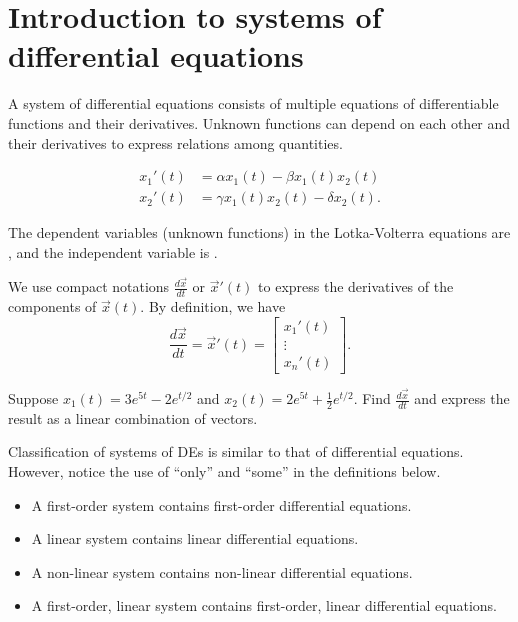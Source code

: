\documentclass[../main.tex]{subfiles}
\begin{document}
 \section{Introduction to systems of differential equations}

A system of differential equations consists of multiple equations of differentiable functions and their derivatives.  Unknown functions can depend on each other and their derivatives to express relations among quantities.

\begin{example} \label{ex:lotka-volterra-intro}
  \begin{align*}
    x_{1}'(t) &= \alpha x_{1}(t) - \beta x_{1}(t) x_{2}(t) \\
    x_{2}'(t) &= \gamma x_{1}(t) x_{2}(t) - \delta x_{2}(t).
  \end{align*}

  The dependent variables (unknown functions) in the Lotka-Volterra equations are \underline{\hspace{1in}}, and the independent variable is \underline{\hspace{1cm}}.
\end{example}

We use compact notations \(\frac{d \vec{x}}{dt}\) or \(\vec{x}'(t)\) to express the derivatives of the components of \(\vec{x}(t)\).   By definition, we have
\[
  \frac{d \vec{x}}{dt} = \vec{x}'(t) = \begin{bmatrix} x_{1}'(t) \\ \vdots \\ x_{n}'(t)\end{bmatrix}.
\]


\begin{example} \label{ex:system-de-derivative}
  Suppose \(x_{1}(t) = 3 e^{5t} -2 e^{t/2}\) and \(x_{2}(t) = 2 e^{5t} + \frac{1}{2}e^{t/2}\). Find \(\frac{d \vec{x}}{dt}\) and express the result as a linear combination of vectors.

\end{example}

Classification of systems of DEs is similar  to that of differential equations. However, notice the use of ``only'' and ``some'' in the definitions below.
\begin{itemize}
  \item A first-order system contains  first-order differential equations.
  \item A linear system contains   linear differential equations.
  \item A non-linear system contains  non-linear differential equations.
  \item A first-order, linear system contains  first-order, linear differential equations.
\end{itemize}
\end{document}
